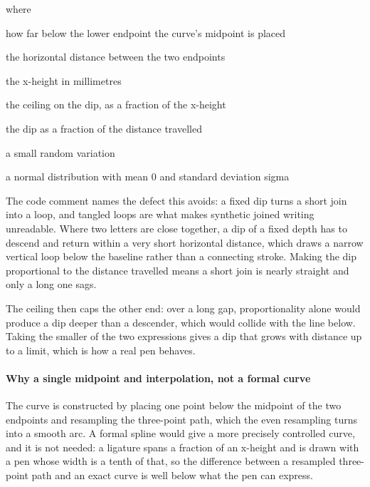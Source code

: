 \noindent where
\begin{description}[leftmargin=2.4em,style=nextline,font=\normalfont\ttfamily]\setlength\itemsep{1pt}
  \item[{$\mathrm{sag}$}] \normalfont how far below the lower endpoint the curve's midpoint is placed
  \item[{$\Delta x$}] \normalfont the horizontal distance between the two endpoints
  \item[{$\mathrm{xh}$}] \normalfont the x-height in millimetres
  \item[{$0.11$}] \normalfont the ceiling on the dip, as a fraction of the x-height
  \item[{$0.16$}] \normalfont the dip as a fraction of the distance travelled
  \item[{$\varepsilon$}] \normalfont a small random variation
  \item[{$\mathcal{N}(0,\sigma)$}] \normalfont a normal distribution with mean 0 and standard deviation sigma
\end{description}
The code comment names the defect this avoids: a fixed dip turns a short join into a loop, and tangled loops are what makes synthetic joined writing unreadable. Where two letters are close together, a dip of a fixed depth has to descend and return within a very short horizontal distance, which draws a narrow vertical loop below the baseline rather than a connecting stroke. Making the dip proportional to the distance travelled means a short join is nearly straight and only a long one sags.

The ceiling then caps the other end: over a long gap, proportionality alone would produce a dip deeper than a descender, which would collide with the line below. Taking the smaller of the two expressions gives a dip that grows with distance up to a limit, which is how a real pen behaves.


\paragraph{Why a single midpoint and interpolation, not a formal curve}
The curve is constructed by placing one point below the midpoint of the two endpoints and resampling the three-point path, which the even resampling turns into a smooth arc. A formal spline would give a more precisely controlled curve, and it is not needed: a ligature spans a fraction of an x-height and is drawn with a pen whose width is a tenth of that, so the difference between a resampled three-point path and an exact curve is well below what the pen can express.


